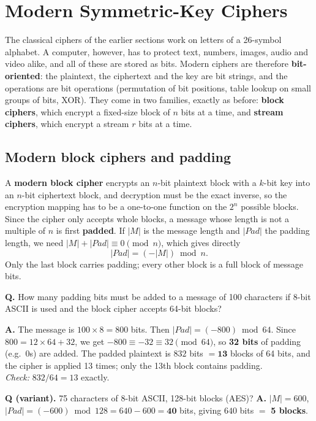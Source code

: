 \section{Modern Symmetric-Key Ciphers}\label{sec:modern}

The classical ciphers of the earlier sections work on letters of a 26-symbol alphabet. A computer, however, has to protect text, numbers, images, audio and video alike, and all of these are stored as bits. Modern ciphers are therefore \textbf{bit-oriented}: the plaintext, the ciphertext and the key are bit strings, and the operations are bit operations (permutation of bit positions, table lookup on small groups of bits, XOR). They come in two families, exactly as before: \textbf{block ciphers}, which encrypt a fixed-size block of $n$ bits at a time, and \textbf{stream ciphers}, which encrypt a stream $r$ bits at a time.

\subsection{Modern block ciphers and padding}
A \textbf{modern block cipher} encrypts an $n$-bit plaintext block with a $k$-bit key into an $n$-bit ciphertext block, and decryption must be the exact inverse, so the encryption mapping has to be a one-to-one function on the $2^n$ possible blocks. Since the cipher only accepts whole blocks, a message whose length is not a multiple of $n$ is first \textbf{padded}. If $|M|$ is the message length and $|Pad|$ the padding length, we need $|M| + |Pad| \equiv 0 \pmod n$, which gives directly
\[
|Pad| = (-|M|) \bmod n .
\]
Only the last block carries padding; every other block is a full block of message bits.

\begin{worked}
\textbf{Q.} How many padding bits must be added to a message of 100 characters if 8-bit ASCII is used and the block cipher accepts 64-bit blocks?

\textbf{A.} The message is $100 \times 8 = 800$ bits. Then $|Pad| = (-800) \bmod 64$. Since $800 = 12 \times 64 + 32$, we get $-800 \equiv -32 \equiv 32 \pmod{64}$, so \textbf{32 bits} of padding (e.g.\ 0s) are added. The padded plaintext is $832$ bits $= \mathbf{13}$ blocks of 64 bits, and the cipher is applied 13 times; only the 13th block contains padding.\\
\emph{Check:} $832 / 64 = 13$ exactly.

\textbf{Q (variant).} 75 characters of 8-bit ASCII, 128-bit blocks (AES)?
\textbf{A.} $|M| = 600$, $|Pad| = (-600) \bmod 128 = 640 - 600 = \mathbf{40}$ bits, giving $640$ bits $=$ \textbf{5 blocks}.
\end{worked}


